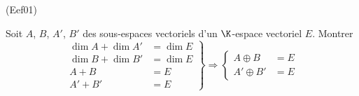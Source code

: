 \begin{tiny}(Eef01)\end{tiny} Soit $A$, $B$, $A'$, $B'$ des sous-espaces vectoriels d'un $\K$-espace vectoriel $E$. Montrer
\[
 \left. 
 \begin{aligned}
  \dim A + \dim A' &= \dim E \\
  \dim B + \dim B' &= \dim E \\
  A + B &= E \\
  A' + B' &= E
 \end{aligned}
\right\rbrace \Rightarrow
\left\lbrace 
\begin{aligned}
 A \oplus B &= E \\ A' \oplus B' &= E
\end{aligned}
\right. 
\]
